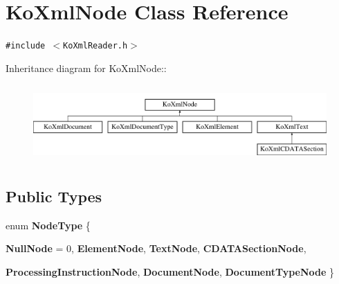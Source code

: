 \hypertarget{classKoXmlNode}{
\section{KoXmlNode Class Reference}
\label{classKoXmlNode}
}
{\tt \#include $<$KoXmlReader.h$>$}

Inheritance diagram for KoXmlNode::\begin{figure}[H]
\begin{center}
\leavevmode
\includegraphics[height=2.97872cm]{classKoXmlNode}
\end{center}
\end{figure}
\subsection*{Public Types}
\begin{CompactItemize}
\item 
enum \textbf{NodeType} \{ \par
\textbf{NullNode} =  0, 
\textbf{ElementNode}, 
\textbf{TextNode}, 
\textbf{CDATASectionNode}, 
\par
\textbf{ProcessingInstructionNode}, 
\textbf{DocumentNode}, 
\textbf{DocumentTypeNode}
 \}
\end{CompactItemize}
